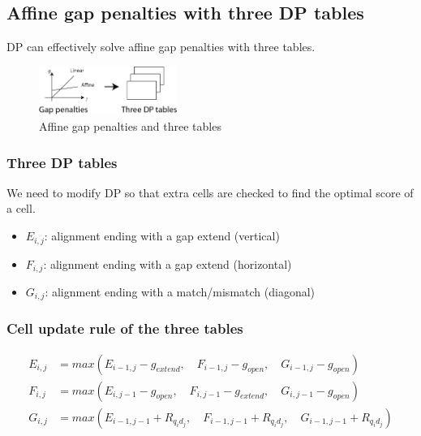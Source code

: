 %
%

%
%
\subsection{Affine gap penalties with three DP tables}
DP can effectively solve affine gap penalties with three tables.

\begin{figure}[H]
  \centering
      \includegraphics[width=0.4\textwidth]{fig03/three_dp_tables_for_affine.png}
  \caption{Affine gap penalties and three tables}
\end{figure}

%
%
\subsubsection*{Three DP tables}
We need to modify DP so that extra cells are checked to find the optimal score of a cell. 

\begin{itemize}
\item $E_{i,j}$: alignment ending with a gap extend (vertical)
\item $F_{i,j}$: alignment ending with a gap extend (horizontal)
\item $G_{i,j}$: alignment ending with a match/mismatch (diagonal)
\end{itemize}

%
%
\subsubsection*{Cell update rule of the three tables}

\begin{align*}
E_{i,j} &= max(E_{i-1,j} - g_{extend}, \quad F_{i-1,j} - g_{open}, \quad G_{i-1,j} - g_{open}) \\
F_{i,j} &= max(E_{i,j-1} - g_{open}, \quad F_{i,j-1} - g_{extend}, \quad G_{i,j-1} - g_{open}) \\
G_{i,j} &= max(E_{i-1,j-1} + R_{q_{i}d_{j}}, \quad F_{i-1,j-1}+ R_{q_{i}d_{j}}, \quad G_{i-1,j-1} + R_{q_{i}d_{j}})
\end{align*}

